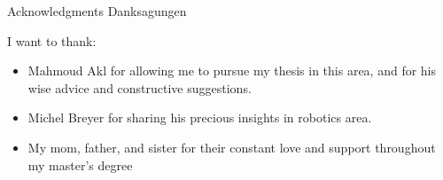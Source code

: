 \makeatletter
{}
{}
{}
\makeatother
\thispagestyle{empty}

\vspace*{20mm}

\begin{center}
\makeatletter
{}
{ Acknowledgments}
{ Danksagungen}
\makeatother
\end{center}

\vspace{10mm}

I want to thank:
\begin{itemize}
    \item  Mahmoud Akl for allowing me to pursue my thesis in this area, and for his wise advice and constructive suggestions. 
    \item Michel Breyer for sharing his precious insights in robotics area.
    \item My mom, father, and sister for their constant love and support throughout my master's degree
\end{itemize}

\cleardoublepage{}
